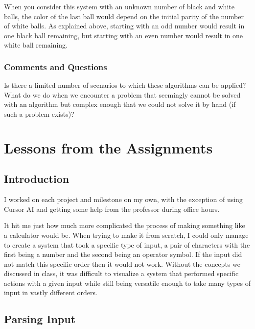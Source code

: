 \documentclass{article}
\theoremstyle{theorem}
\theoremstyle{definition}
\theoremstyle{remark}
\begin{document}
\hspace{0.65cm}When you consider this system with an unknown number of black and white balls, the color of the last ball would depend on the initial parity of the number of white balls. As explained above, starting with an odd number would 
result in one black ball remaining, but starting with an even number would result in one white ball remaining.

\subsubsection{Comments and Questions}

Is there a limited number of scenarios to which these algorithms can be applied? What do we do when we encounter a problem that seemingly cannot be solved with an algorithm but complex enough that we could not solve it by hand (if such a problem exists)?

\section{Lessons from the Assignments}

\subsection{Introduction}

I worked on each project and milestone on my own, with the exception of using Cursor AI and getting some help from the professor during office hours.

\hspace{0.65cm}It hit me just how much more complicated the process of making something like a calculator would be. When trying to make it from scratch, I could only manage to create a system that 
took a specific type of input, a pair of characters with the first being a number and the second being an operator symbol. If the input did not match this specific order then it would not work. Without the concepts we discussed in class,
it was difficult to visualize a system that performed specific actions with a given input while still being versatile enough to take many types of input in vastly different orders.

\subsection{Parsing Input}
\end{document}
